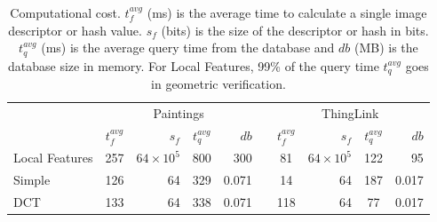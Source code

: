 \documentclass[english,12pt,a4paper,pdftex,elec,utf8, table]{aaltothesis}
\begin{document}



\begin{table} \footnotesize
  \caption{Computational cost. $t_f^{avg}$ (ms) is the average time to calculate a single image descriptor or hash value. $s_f$ (bits) is the size of the descriptor or hash in bits. $t_q^{avg}$ (ms) is the average query time from the database and $db$ (MB) is the database size in memory. For Local Features, 99\% of the query time $t_q^{avg}$ goes in geometric verification.}
\label{computationalcost}
\begin{center}
  \setlength\tabcolsep{3pt} %
  \begin{tabular}{@{}lcrcrrcrcr@{}}
    \toprule
    & \multicolumn{4}{c}{Paintings} &\phantom{abc} &\multicolumn{4}{c}{ThingLink}\\
\cmidrule{2-6} \cmidrule{7-10}
  & $t_f^{avg} $&  $s_f$ & $t_q^{avg}$& $db$ &\phantom{abc} & $t_f^{avg} $&  $s_f$& $t_q^{avg}$& $db$\\ \midrule
    Local Features & 257 & $64 \times 10^5$ & 800 & 300&\phantom{abc} & 81 & $64 \times 10^5$& 122 &95\\
    Simple & 126 & 64 & 329 & 0.071 &\phantom{abc} & 14 & 64 & 187 & 0.017\\
    DCT   & 133 & 64 & 338 & 0.071 & \phantom{abc} & 118 & 64 & 77 & 0.017\\
 \bottomrule
\end{tabular}
\end{center}\end{table}
\end{document}

